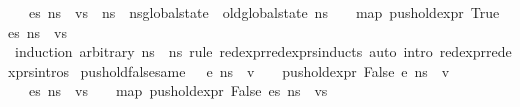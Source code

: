\begin{isabellebody}
\ {\isachardoublequoteopen}{\isasymLambda}{\isacharcomma}{\kern0pt}{\isasymGamma}{\isacharcomma}{\kern0pt}{\isasymOmega}\ {\isasymturnstile}\ {\isasymlangle}es{\isacharcomma}{\kern0pt}\ ns{\isasymrangle}\ {\isacharbrackleft}{\kern0pt}{\isasymDown}{\isacharbrackright}{\kern0pt}\ vs\ {\isasymLongrightarrow}\ ns\ {\isacharequal}{\kern0pt}\ ns{\isacharprime}{\kern0pt}{\isasymlparr}global{\isacharunderscore}{\kern0pt}state\ {\isacharcolon}{\kern0pt}{\isacharequal}{\kern0pt}\ old{\isacharunderscore}{\kern0pt}global{\isacharunderscore}{\kern0pt}state\ ns{\isacharprime}{\kern0pt}{\isasymrparr}\ {\isasymLongrightarrow}\ {\isasymLambda}{\isacharcomma}{\kern0pt}{\isasymGamma}{\isacharcomma}{\kern0pt}{\isasymOmega}\ {\isasymturnstile}\ {\isasymlangle}map\ {\isacharparenleft}{\kern0pt}push{\isacharunderscore}{\kern0pt}old{\isacharunderscore}{\kern0pt}expr\ True{\isacharparenright}{\kern0pt}\ es{\isacharcomma}{\kern0pt}\ ns{\isacharprime}{\kern0pt}{\isasymrangle}\ {\isacharbrackleft}{\kern0pt}{\isasymDown}{\isacharbrackright}{\kern0pt}\ vs{\isachardoublequoteclose}\isanewline
%
\isadelimproof
\ \ %
\endisadelimproof
%
\isatagproof
{}\isamarkupfalse%
\ {\isacharparenleft}{\kern0pt}induction\ arbitrary{\isacharcolon}{\kern0pt}\ ns{\isacharprime}{\kern0pt}\ \ ns{\isacharprime}{\kern0pt}\ rule{\isacharcolon}{\kern0pt}\ red{\isacharunderscore}{\kern0pt}expr{\isacharunderscore}{\kern0pt}red{\isacharunderscore}{\kern0pt}exprs{\isachardot}{\kern0pt}inducts{\isacharcomma}{\kern0pt}\ auto\ intro{\isacharcolon}{\kern0pt}\ red{\isacharunderscore}{\kern0pt}expr{\isacharunderscore}{\kern0pt}red{\isacharunderscore}{\kern0pt}exprs{\isachardot}{\kern0pt}intros{\isacharparenright}{\kern0pt}%
\endisatagproof
{\isafoldproof}%
%
\isadelimproof
\isanewline
%
\endisadelimproof
\isanewline
{}\isamarkupfalse%
\ push{\isacharunderscore}{\kern0pt}old{\isacharunderscore}{\kern0pt}false{\isacharunderscore}{\kern0pt}same{\isacharcolon}{\kern0pt}\ {\isachardoublequoteopen}{\isasymLambda}{\isacharcomma}{\kern0pt}{\isasymGamma}{\isacharcomma}{\kern0pt}{\isasymOmega}\ {\isasymturnstile}\ {\isasymlangle}e{\isacharcomma}{\kern0pt}\ ns{\isasymrangle}\ {\isasymDown}\ v\ {\isasymLongrightarrow}\ {\isasymLambda}{\isacharcomma}{\kern0pt}{\isasymGamma}{\isacharcomma}{\kern0pt}{\isasymOmega}\ {\isasymturnstile}\ {\isasymlangle}push{\isacharunderscore}{\kern0pt}old{\isacharunderscore}{\kern0pt}expr\ False\ e{\isacharcomma}{\kern0pt}\ ns{\isasymrangle}\ {\isasymDown}\ v{\isachardoublequoteclose}\isanewline
{}\ {\isachardoublequoteopen}{\isasymLambda}{\isacharcomma}{\kern0pt}{\isasymGamma}{\isacharcomma}{\kern0pt}{\isasymOmega}\ {\isasymturnstile}\ {\isasymlangle}es{\isacharcomma}{\kern0pt}\ ns{\isasymrangle}\ {\isacharbrackleft}{\kern0pt}{\isasymDown}{\isacharbrackright}{\kern0pt}\ vs\ {\isasymLongrightarrow}\ {\isasymLambda}{\isacharcomma}{\kern0pt}{\isasymGamma}{\isacharcomma}{\kern0pt}{\isasymOmega}\ {\isasymturnstile}\ {\isasymlangle}map\ {\isacharparenleft}{\kern0pt}push{\isacharunderscore}{\kern0pt}old{\isacharunderscore}{\kern0pt}expr\ False{\isacharparenright}{\kern0pt}\ es{\isacharcomma}{\kern0pt}\ ns{\isasymrangle}\ {\isacharbrackleft}{\kern0pt}{\isasymDown}{\isacharbrackright}{\kern0pt}\ vs{\isachardoublequoteclose}\isanewline

\end{isabellebody}
